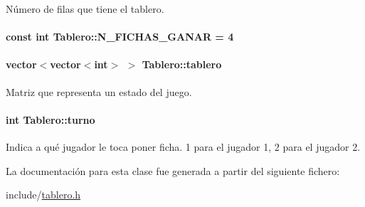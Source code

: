 Número de filas que tiene el tablero. 

\paragraph[{\texorpdfstring{N\+\_\+\+F\+I\+C\+H\+A\+S\+\_\+\+G\+A\+N\+AR}{N_FICHAS_GANAR}}]{\setlength{\rightskip}{0pt plus 5cm}const int Tablero\+::\+N\+\_\+\+F\+I\+C\+H\+A\+S\+\_\+\+G\+A\+N\+AR = 4\hspace{0.3cm}{\ttfamily [static]}}\hypertarget{classTablero_aa38ed353bef45bd6c5a2e3aa4a897720}{}\label{classTablero_aa38ed353bef45bd6c5a2e3aa4a897720}
\paragraph[{\texorpdfstring{tablero}{tablero}}]{\setlength{\rightskip}{0pt plus 5cm}vector$<$vector$<$int$>$ $>$ Tablero\+::tablero\hspace{0.3cm}{\ttfamily [private]}}\hypertarget{classTablero_a5df607d108c0c0a14aa4f393b7f43030}{}\label{classTablero_a5df607d108c0c0a14aa4f393b7f43030}


Matriz que representa un estado del juego. 

\paragraph[{\texorpdfstring{turno}{turno}}]{\setlength{\rightskip}{0pt plus 5cm}int Tablero\+::turno\hspace{0.3cm}{\ttfamily [private]}}\hypertarget{classTablero_ae460b4a3245da075dd381365abf158bc}{}\label{classTablero_ae460b4a3245da075dd381365abf158bc}


Indica a qué jugador le toca poner ficha. 1 para el jugador 1, 2 para el jugador 2. 



La documentación para esta clase fue generada a partir del siguiente fichero\+:\begin{DoxyCompactItemize}
\item 
include/\hyperlink{tablero_8h}{tablero.\+h}\end{DoxyCompactItemize}
